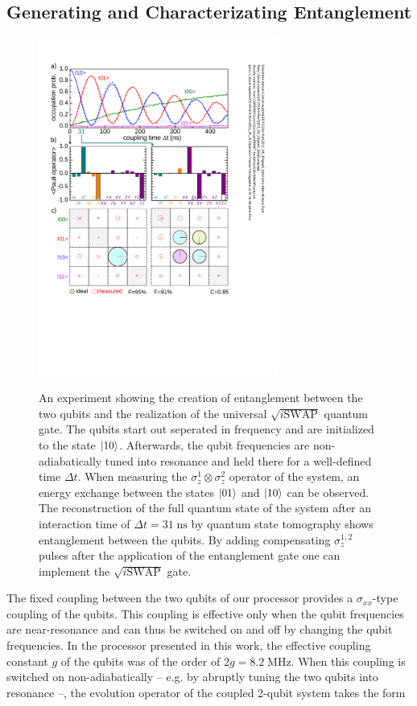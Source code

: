\subsection{Generating and Characterizating Entanglement}

\begin{figure}
	\centering
		\includegraphics[width=0.7\textwidth]{./material/papers/iswap/submission1/Dewes_Figure2}
	\label{fig:iSwap2}
	\caption{An experiment showing the creation of entanglement between the two qubits and the realization of the universal $\sqrt{i\mathrm{SWAP}}$ quantum gate. The qubits start out seperated in frequency and are initialized to the state $\left| 10 \right>$. Afterwards, the qubit frequencies are non-adiabatically tuned into resonance and held there for a well-defined time $\Delta t$. When measuring the $\sigma_z^1 \otimes \sigma_z^2$ operator of the system, an energy exchange between the states $\left| 01 \right>$ and $\left| 10 \right>$ can be observed. The reconstruction of the full quantum state of the system after an interaction time of $\Delta t = 31 \; \mathrm{ns} $ by quantum state tomography shows entanglement between the qubits. By adding compensating $\sigma_z^{1,2}$ pulses after the application of the entanglement gate one can implement the $\sqrt{i\mathrm{SWAP}}$ gate.}
\end{figure}

The fixed coupling between the two qubits of our processor provides a $\sigma_{xx}$-type coupling of the qubits. This coupling is effective only when the qubit frequencies are near-resonance and can thus be switched on and off by changing the qubit frequencies. In the processor presented in this work, the effective coupling constant $g$ of the qubits was of the order of $2g = 8.2 \; \mathrm{MHz}$. When this coupling is switched on non-adiabatically -- e.g. by abruptly tuning the two qubits into resonance --, the evolution operator of the coupled 2-qubit system takes the form

